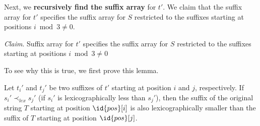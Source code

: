 Next, we \textbf{recursively find the suffix array} for $t'$. We claim that the suffix array for $t'$ specifies the suffix array for $S$ restricted to the suffixes starting at positions $i \bmod 3 \neq 0$.


\textit{Claim}. Suffix array for $t'$ specifies the suffix array for $S$ restricted to the suffixes starting at positions $i \bmod 3 \neq 0$

To see why this is true, we first prove this lemma.

\begin{lemma}
    Let $t_i'$ and $t_j'$ be two suffixes of $t'$ starting at position $i$ and $j$, respectively. If $s_i' \prec_{lex} s_j'$ (if $s_i'$ is lexicographically less than $s_j'$), then the suffix of the original string $T$ starting at position $\id{pos}[i]$ is also lexicographically smaller than the suffix of $T$ starting at position $\id{pos}[j]$.
\end{lemma}

